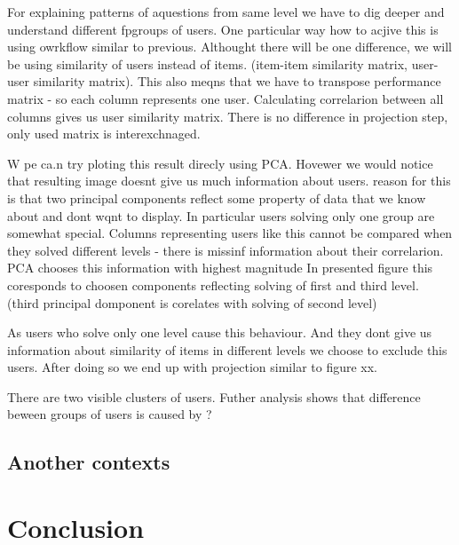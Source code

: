 \documentclass[
  digital, %
  table,   %
  nolof,     %
  nolot,     %
  nocover
]{fithesis3}
\begin{document}
For explaining patterns of aquestions from same level we have to dig
deeper and understand different fpgroups of users. One particular way
how to acjive this is using owrkflow similar to previous. Althought
there will be one difference, we will be using similarity of users
instead of items. (item-item similarity matrix, user-user similarity
matrix). This also meqns that we have to transpose performance matrix -
so each column represents one user. Calculating correlarion between all
columns gives us user similarity matrix. There is no difference in
projection step, only used matrix is interexchnaged.

W pe ca.n try ploting this result direcly using PCA. Hovewer we would
notice that resulting image doesnt give us much information about users.
reason for this is that two principal components reflect some property
of data that we know about and dont wqnt to display. In particular users
solving only one group are somewhat special. Columns representing users
like this cannot be compared when they solved different levels - there
is missinf information about their correlarion. PCA chooses this
information with highest magnitude In presented figure this coresponds
to choosen components reflecting solving of first and third level.
(third principal domponent is corelates with solving of second level)

As users who solve only one level cause this behaviour. And they dont
give us information about similarity of items in different levels we
choose to exclude this users. After doing so we end up with projection
similar to figure xx.

There are two visible clusters of users. Futher analysis shows that
difference beween groups of users is caused by ?

\section{Another contexts}\label{another-contexts}



\chapter{Conclusion}

\end{document}
